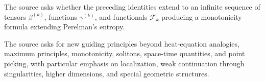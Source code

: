 \begin{remark}
\label{rem:chow-iii-ch17-higher-loop-problem}
The source asks whether the preceding identities extend to an infinite
sequence of tensors $\beta^{(k)}$, functions $\gamma^{(k)}$, and functionals
$\mathcal F_k$ producing a monotonicity formula extending Perelman's entropy.
\end{remark}

\begin{remark}
\label{rem:chow-iii-ch17-guiding-principles-problem}
The source asks for new guiding principles beyond heat-equation analogies,
maximum principles, monotonicity, solitons, space-time quantities, and point
picking, with particular emphasis on localization, weak continuation through
singularities, higher dimensions, and special geometric structures.
\end{remark}
